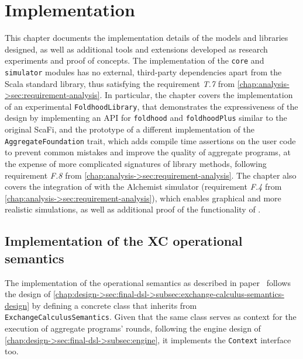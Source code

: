 \chapter{Implementation}
\label{chap:implementation}

This chapter documents the implementation details of the models and libraries designed, as well as additional tools and extensions developed as research experiments and proof of concepts.
%
The implementation of the \texttt{core} and \texttt{simulator} modules has no external, third-party dependencies apart from the Scala standard library, thus satisfying the requirement \textit{T.7} from \cref{chap:analysis->sec:requirement-analysis}.
%
In particular, the chapter covers the implementation of an experimental \texttt{FoldhoodLibrary}, that demonstrates the expressiveness of the \this design by implementing an \ac{API} for \texttt{foldhood} and \texttt{foldhoodPlus} similar to the original ScaFi, and the prototype of a different implementation of the \texttt{AggregateFoundation} trait, which adds compile time assertions on the user code to prevent common mistakes and improve the quality of aggregate programs, at the expense of more complicated signatures of library methods, following requirement \textit{F.8} from \cref{chap:analysis->sec:requirement-analysis}.
%
The chapter also covers the integration of \this with the Alchemist simulator (requirement \textit{F.4} from \cref{chap:analysis->sec:requirement-analysis}), which enables graphical and more realistic simulations, as well as additional proof of the functionality of \this.

\section{Implementation of the XC operational semantics} \label{chap:implementation->sec:xc-ops}

The implementation of the operational semantics as described in paper~\cite{xc} follows the design of \cref{chap:design->sec:final-dsl->subsec:exchange-calculus-semantics-design} by defining a concrete class that inherits from \texttt{ExchangeCalculusSemantics}.
%
Given that the same class serves as context for the execution of aggregate programs' rounds, following the engine design of \cref{chap:design->sec:final-dsl->subsec:engine}, it implements the \texttt{Context} interface too.

